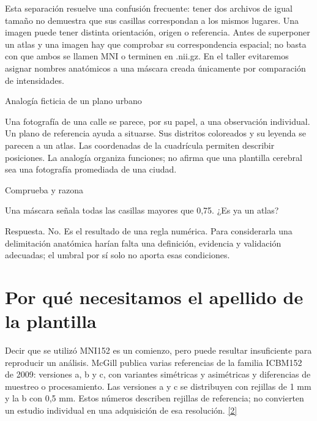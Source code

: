 Esta separación resuelve una confusión frecuente: tener dos archivos de igual tamaño no demuestra que sus casillas correspondan a los mismos lugares. Una imagen puede tener distinta orientación, origen o referencia. Antes de superponer un atlas y una imagen hay que comprobar su correspondencia espacial; no basta con que ambos se llamen MNI o terminen en .nii.gz. En el taller evitaremos asignar nombres anatómicos a una máscara creada únicamente por comparación de intensidades.




\begin{Idea}{Analogía ficticia de un plano urbano}

Una fotografía de una calle se parece, por su papel, a una observación individual. Un plano de referencia ayuda a situarse. Sus distritos coloreados y su leyenda se parecen a un atlas. Las coordenadas de la cuadrícula permiten describir posiciones. La analogía organiza funciones; no afirma que una plantilla cerebral sea una fotografía promediada de una ciudad.


\end{Idea}


\begin{Practica}{Comprueba y razona}

Una máscara señala todas las casillas mayores que 0,75. ¿Es ya un atlas?


Respuesta. No. Es el resultado de una regla numérica. Para considerarla una delimitación anatómica harían falta una definición, evidencia y validación adecuadas; el umbral por sí solo no aporta esas condiciones.


\end{Practica}

\section{Por qué necesitamos el apellido de la plantilla}

Decir que se utilizó MNI152 es un comienzo, pero puede resultar insuficiente para reproducir un análisis. McGill publica varias referencias de la familia ICBM152 de 2009: versiones a, b y c, con variantes simétricas y asimétricas y diferencias de muestreo o procesamiento. Las versiones a y c se distribuyen con rejillas de 1 mm y la b con 0,5 mm. Estos números describen rejillas de referencia; no convierten un estudio individual en una adquisición de esa resolución. \hyperlink{refR2}{[2]}


